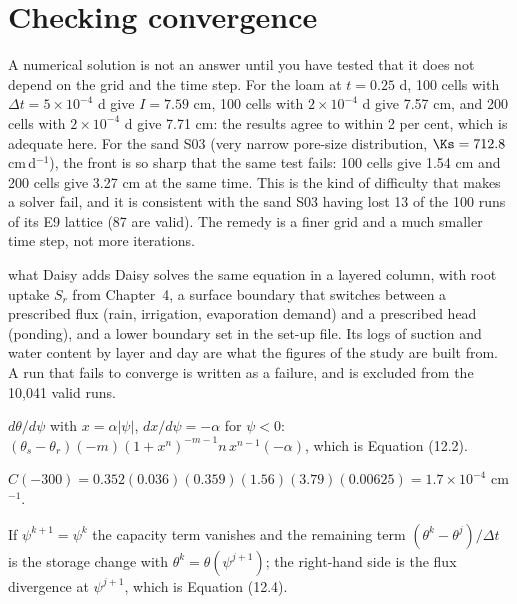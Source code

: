 \section{Checking convergence}
A numerical solution is not an answer until you have tested that it does not depend on the grid and the time step. For the loam at $t=0.25$ d, 100 cells with $\Delta t=5\times10^{-4}$ d give $I=7.59$ cm, 100 cells with $2\times10^{-4}$ d give 7.57 cm, and 200 cells with $2\times10^{-4}$ d give 7.71 cm: the results agree to within 2 per cent, which is adequate here. For the sand S03 (very narrow pore-size distribution, $\Ks=712.8$ cm\,d$^{-1}$), the front is so sharp that the same test fails: 100 cells give 1.54 cm and 200 cells give 3.27 cm at the same time. This is the kind of difficulty that makes a solver fail, and it is consistent with the sand S03 having lost 13 of the 100 runs of its E9 lattice (87 are valid). The remedy is a finer grid and a much smaller time step, not more iterations.

\begin{daisybox}{what Daisy adds}
Daisy solves the same equation in a layered column, with root uptake $S_r$ from Chapter~4, a surface boundary that switches between a prescribed flux (rain, irrigation, evaporation demand) and a prescribed head (ponding), and a lower boundary set in the set-up file. Its logs of suction and water content by layer and day are what the figures of the study are built from. A run that fails to converge is written as a failure, and is excluded from the 10,041 valid runs.
\end{daisybox}

\sol  $d\theta/d\psi$ with $x=\alpha|\psi|$, $dx/d\psi=-\alpha$ for $\psi<0$: $(\theta_s-\theta_r)(-m)(1+x^n)^{-m-1}n\,x^{n-1}(-\alpha)$, which is Equation (12.2).

\sol  $C(-300)=0.352(0.036)(0.359)(1.56)(3.79)(0.00625)=1.7\times10^{-4}$ cm$^{-1}$.

\sol  If $\psi^{k+1}=\psi^k$ the capacity term vanishes and the remaining term $(\theta^k-\theta^j)/\Delta t$ is the storage change with $\theta^k=\theta(\psi^{j+1})$; the right-hand side is the flux divergence at $\psi^{j+1}$, which is Equation (12.4).

